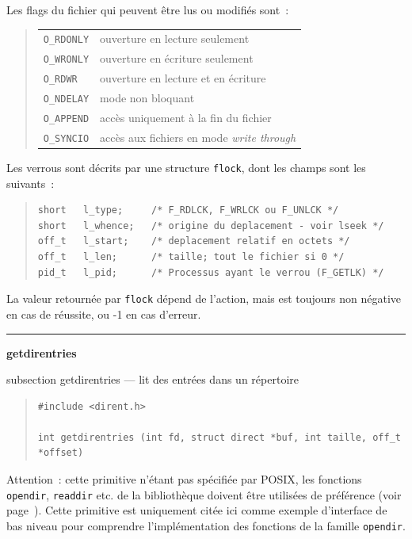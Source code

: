 \documentclass [twoside] {report}
\newcommand {\primitive} [1]
    {
	\phantomsection
	{\large \textbf {#1}}
	\addcontentsline {toc} {subsection} {#1}
    }
\newcommand {\separation}
    {
	\vspace {5mm}
	\nopagebreak
	\hrule
    }
\begin{document}
Les flags du fichier qui peuvent être lus ou modifiés sont~:

{\small
\begin {quote}
    \begin {tabular} {|ll|} \hline
	\texttt {O\_RDONLY} & ouverture en lecture seulement \\
	\texttt {O\_WRONLY} & ouverture en écriture seulement \\
	\texttt {O\_RDWR} & ouverture en lecture et en écriture \\
	\texttt {O\_NDELAY} & mode non bloquant \\
	\texttt {O\_APPEND} & accès uniquement à la fin du fichier \\
	\texttt {O\_SYNCIO} & accès aux fichiers en mode \emph {write through}
	    \\ \hline
    \end {tabular}
\end {quote}
}

Les verrous sont décrits par une structure \texttt {flock}, dont les champs
sont les suivants~:

\begin {quote}
\begin {verbatim}
short   l_type;     /* F_RDLCK, F_WRLCK ou F_UNLCK */
short   l_whence;   /* origine du deplacement - voir lseek */
off_t   l_start;    /* deplacement relatif en octets */
off_t   l_len;      /* taille; tout le fichier si 0 */
pid_t   l_pid;      /* Processus ayant le verrou (F_GETLK) */
\end{verbatim}
\end {quote}

La valeur retournée par \texttt {flock} dépend de l'action, mais est
toujours non négative en cas de réussite, ou
-1 en cas d'erreur.




\separation
\primitive {getdirentries} --- lit des entrées dans un répertoire

\begin {quote}
\begin {verbatim}
#include <dirent.h>

int getdirentries (int fd, struct direct *buf, int taille, off_t *offset)
\end{verbatim}
\end {quote}

Attention~:  cette primitive n'étant pas spécifiée par POSIX, les
fonctions \texttt {opendir}, \texttt {readdir} etc.  de la bibliothèque
doivent être utilisées de préférence (voir page~\pageref {opendir}).
Cette primitive est uniquement citée ici comme exemple d'interface de
bas niveau pour comprendre l'implémentation des fonctions de la famille
\texttt {opendir}.
\end{document}
